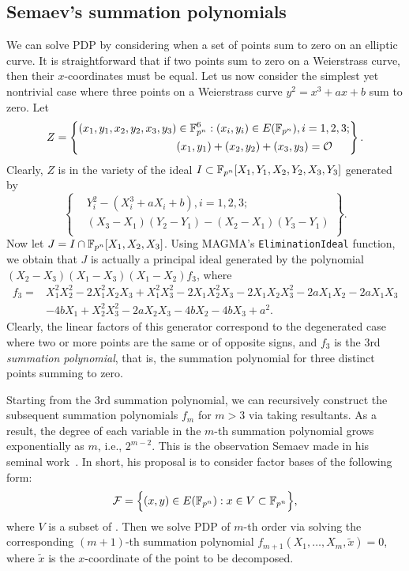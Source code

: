 \subsection{Semaev's summation polynomials}
%
\label{sec:summation-polynomial}
%
We can solve PDP by considering when a set of points sum to zero on an
elliptic curve.
%
It is straightforward that if two points sum to zero on a Weierstrass
curve, then their $x$-coordinates must be equal.
%
Let us now consider the simplest yet nontrivial case where three
points on a Weierstrass curve $y^2=x^3+ax+b$ sum to zero.
%
Let
\[ Z=\left\{\begin{aligned}
      (x_1,y_1,x_2,y_2,x_3,y_3)&\in\mathbb F_{p^n}^6:(x_i,y_i)\in E(\mathbb F_{p^n}),i=1,2,3; \\
      & (x_1,y_1)+(x_2,y_2)+(x_3,y_3)=\mathcal O
    \end{aligned} \right\}. \]
%
Clearly, $Z$ is in the variety of the ideal
$I\subset\mathbb F_{p^n}[X_1,Y_1,X_2,Y_2,X_3,Y_3]$ generated by
\[ \left\{\begin{aligned}
      & Y_i^2 - (X_i^3 + aX_i + b),i=1,2,3; \\
      &  (X_3 - X_1)(Y_2 - Y_1) - (X_2 - X_1)(Y_3 - Y_1)\\
    \end{aligned}\right\}. \]
%
Now let $J=I\cap\mathbb F_{p^n}[X_1,X_2,X_3]$.
%
Using MAGMA's \texttt{EliminationIdeal} function, we obtain that $J$
is actually a principal ideal generated by the polynomial
$(X_2 - X_3)(X_1 - X_3)(X_1 - X_2)f_3$, where
%
\begin{align*}
  f_3 = & X_1^2X_2^2 - 2X_1^2X_2X_3 + X_1^2X_3^2 - 2X_1X_2^2X_3 - 2X_1X_2X_3^2 - 2aX_1X_2 - 2aX_1X_3 \\
        & - 4bX_1 + X_2^2X_3^2 - 2aX_2X_3 - 4bX_2 - 4bX_3 + a^2.
\end{align*}
%
Clearly, the linear factors of this generator correspond to the
degenerated case where two or more points are the same or of opposite
signs, and $f_3$ is the 3rd \emph{summation polynomial}, that is, the
summation polynomial for three distinct points summing to zero.

Starting from the 3rd summation polynomial, we can recursively
construct the subsequent summation polynomials $f_m$ for $m>3$ via
taking resultants.
%
As a result, the degree of each variable in the $m$-th summation
polynomial grows exponentially as $m$, i.e., $2^{m-2}$.
%
This is the observation Semaev made in his seminal
work~\cite{DBLP:journals/iacr/Semaev04}.
%
In short, his proposal is to consider factor bases of the following
form:
\[ \mathcal F=\Big\{(x,y)\in E(\mathbb F_{p^n}):x\in V\subset\mathbb F_{p^n}\Big\}, \]
where $V$ is a subset of .
%
Then we solve PDP of $m$-th order via solving the corresponding
$(m+1)$-th summation polynomial $f_{m+1}(X_1,\ldots,X_m,\tilde x)=0$,
where $\tilde x$ is the $x$-coordinate of the point to be decomposed.

